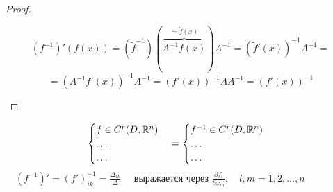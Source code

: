 \begin{proof}
\begin{enumerate}
                \[
                    (f^{-1})'(f(x)) = (\tilde f^{-1})(\overbrace{A^{-1}f(x)}^{=\tilde f(x)}) A^{-1} = (\tilde f'(x))^{-1} A^{-1} =
                \]
                \[
                    = (A^{-1} f'(x))^{-1}A^{-1} = (f'(x))^{-1} AA^{-1} = (f'(x))^{-1}    
                \]
        \end{enumerate}
    \end{proof}

    \begin{remark}
        \[
            \begin{cases}
                f \in C^r(D, \mathbb{R}^n) \\
                \dots \\
                \dots
            \end{cases} = \begin{cases}
                f^{-1} \in C^r(D, \mathbb{R}^n) \\
                \dots \\
                \dots
            \end{cases}
        \]
        $\quad (f^{-1})' = (f')_{ik}^{-1} = \frac{\Delta_{ik}}{\Delta} \quad$ выражается через $\frac{\partial f_l}{\partial x_m}, \quad l, m = 1, 2, \dots, n$
    \end{remark}

